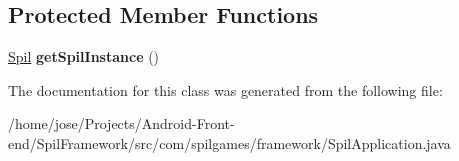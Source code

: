 \subsection*{Protected Member Functions}
\begin{DoxyCompactItemize}
\item 
\hypertarget{classcom_1_1spilgames_1_1framework_1_1_spil_application_a00626f3e421f8c031082dd330996b403}{\hyperlink{classcom_1_1spilgames_1_1framework_1_1_spil}{Spil} {\bfseries get\-Spil\-Instance} ()}\label{classcom_1_1spilgames_1_1framework_1_1_spil_application_a00626f3e421f8c031082dd330996b403}

\end{DoxyCompactItemize}


The documentation for this class was generated from the following file\-:\begin{DoxyCompactItemize}
\item 
/home/jose/\-Projects/\-Android-\/\-Front-\/end/\-Spil\-Framework/src/com/spilgames/framework/Spil\-Application.\-java\end{DoxyCompactItemize}
